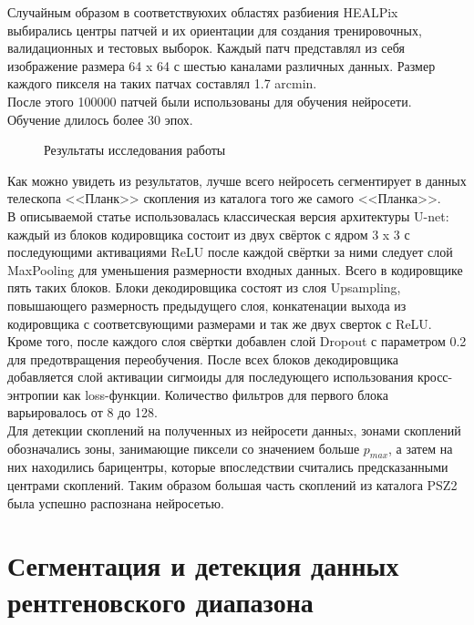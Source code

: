 Случайным образом в соответствуюхих областях разбиения HEALPix выбирались центры патчей и их 
ориентации для создания тренировочных, валидационных и тестовых выборок. Каждый патч представлял 
из себя изображение размера 64 x 64 с шестью каналами различных данных. Размер каждого пикселя 
на таких патчах составлял 1.7 arcmin. \\

После этого 100000 патчей были использованы для обучения нейросети. Обучение длилось более 30 эпох. \\ 
\begin{figure}[h!]
	\center{\texttt{[image: sz0]}}
	\caption{Результаты исследования работы \cite{Bonjean}}
\end{figure}

Как можно увидеть из результатов, лучше всего нейросеть сегментирует в данных телескопа <<Планк>> 
скопления из каталога того же самого <<Планка>>.\\

В описываемой статье использовалась классическая версия архитектуры U-net: каждый из блоков 
кодировщика состоит из двух свёрток с ядром 3 x 3 с последующими активациями ReLU после каждой 
свёртки за ними следует слой MaxPooling для уменьшения размерности входных данных. Всего в 
кодировщике пять таких блоков. Блоки декодировщика состоят из слоя Upsampling, повышающего 
размерность предыдущего слоя, конкатенации выхода из кодировщика с соответсвующими размерами и 
так же двух сверток с ReLU. Кроме того, после каждого слоя свёртки добавлен слой Dropout с 
параметром 0.2 для предотвращения переобучения. После всех блоков декодировщика добавляется слой 
активации сигмоиды для последующего использования кросс-энтропии как loss-функции. Количество 
фильтров для первого блока варьировалось от 8 до 128.\\

Для детекции скоплений на полученных из нейросети данныx, зонами скоплений обозначались зоны, 
занимающие пиксели со значением больше $p_{max}$, а затем на них находились барицентры, которые 
впоследствии считались предсказанными центрами скоплений. Таким образом большая часть скоплений из 
каталога PSZ2 была успешно распознана нейросетью. \\

\section{Сегментация и детекция данных рентгеновского диапазона}

